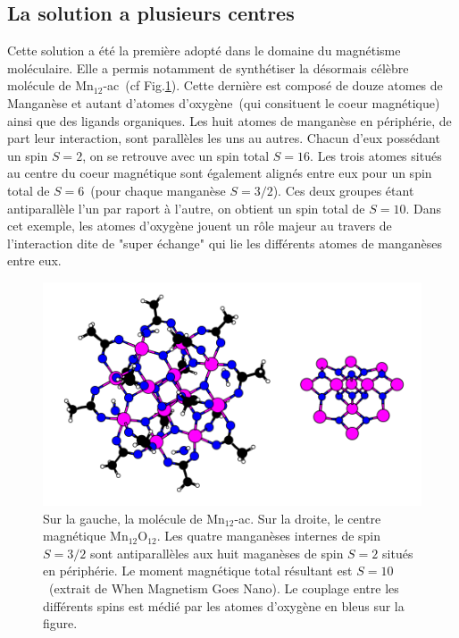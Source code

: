 \subsection{La solution a plusieurs centres}
Cette solution a été la première adopté dans le domaine du magnétisme moléculaire. Elle a permis notamment de synthétiser la désormais célèbre molécule de Mn$_{12}$-ac~(cf Fig.\ref{Mn12}). Cette dernière est composé de douze atomes de Manganèse et autant d'atomes d'oxygène~(qui consituent le coeur magnétique) ainsi que des ligands organiques. Les huit atomes de manganèse en périphérie, de part leur interaction, sont parallèles les uns au autres. Chacun d'eux possédant un spin $S=2$, on se retrouve avec un spin total $S=16$. Les trois atomes situés au centre du coeur magnétique sont également alignés entre eux pour un spin total de $S=6$~(pour chaque manganèse $S=3/2$). Ces deux groupes étant antiparallèle l'un par raport à l'autre, on obtient un spin total de $S=10$. Dans cet exemple, les atomes d'oxygène jouent un r\^ole majeur au travers de l'interaction dite de "super échange" qui lie les différents atomes de manganèses entre eux.
\begin{figure}
\centering \includegraphics[scale=0.3]{Theorie/MagMol/figure1/Mn12.png} 
\caption{Sur la gauche, la molécule de Mn$_{12}$-ac. Sur la droite, le centre magnétique Mn$_{12}$O$_{12}$. Les quatre manganèses internes de spin $S=3/2$ sont antiparallèles aux huit maganèses de spin $S=2$ situés en périphérie. Le moment magnétique total résultant est $S=10$~(extrait de When Magnetism Goes Nano). Le couplage entre les différents spins est médié par les atomes d'oxygène en bleus sur la figure.}
\label{Mn12}
\end{figure}

